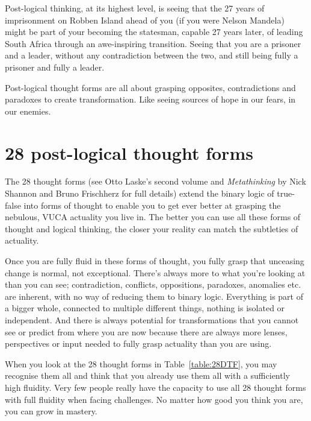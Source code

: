 Post-logical thinking, at its highest level, is seeing that the 27 years of imprisonment on Robben Island ahead of you (if you were Nelson Mandela)  might be part of your becoming the statesman, capable 27 years later, of leading South Africa through an awe-inspiring transition. Seeing that you are a prisoner and a leader, without any contradiction between the two, and still being fully a prisoner and fully a leader.


Post-logical thought forms are all about grasping opposites, contradictions and paradoxes to create transformation. Like seeing sources of hope in our fears, in our enemies.


\section{28 post-logical thought forms}
\label{section:dtf-description} 


The 28 thought forms (see Otto Laske's second volume\cite{laske-vol2} and \emph{Metathinking}\cite{shannon-metathinking} by Nick Shannon and Bruno Frischherz for full details) extend the binary logic of true-false into forms of thought to enable you to get ever better at grasping the nebulous, VUCA actuality you live in. The better you can use all these forms of thought and logical thinking, the closer your reality can match the subtleties of actuality. 


Once you are fully fluid in these forms of thought, you fully grasp that unceasing change is normal, not exceptional. There's always more to what you're looking at than you can see; contradiction, conflicts, oppositions, paradoxes, anomalies etc. are inherent, with no way of reducing them to binary logic. Everything is part of a bigger whole, connected to multiple different things, nothing is isolated or independent. And there is always potential for transformations that you cannot see or predict from where you are now because there are always more lenses, perspectives or input needed to fully grasp actuality than you are using.


When you look at the 28 thought forms in Table~\ref{table:28DTF}, you may recognise them all and think that you already use them all with a sufficiently high fluidity. Very few people really have the capacity to use all 28 thought forms with full fluidity when facing challenges. No matter how good you think you are, you can grow in mastery.


